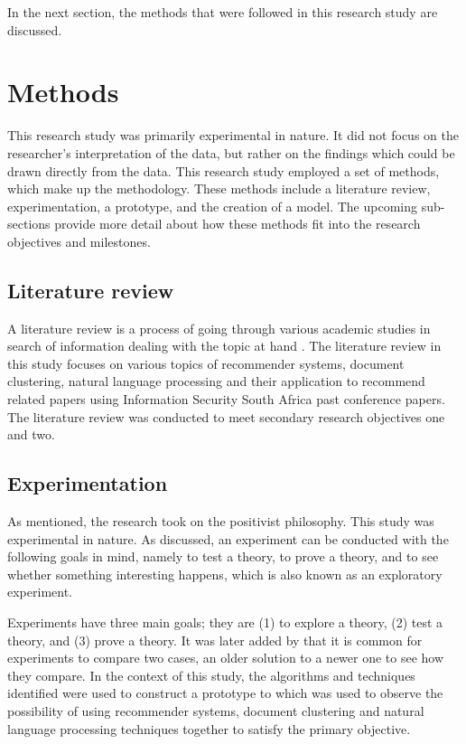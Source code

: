 In the next section, the methods that were followed in this research study are discussed.

\section{Methods} \label{ssec:meth}

This research study was primarily experimental in nature. It did not focus on the researcher’s interpretation of the data, but rather on the findings which could be drawn directly from the data. This research study employed a set of methods, which make up the methodology. These methods include a literature review, experimentation, a prototype, and the creation of a model. The upcoming sub-sections provide more detail about how these methods fit into the research objectives and milestones.

\subsection{Literature review} \label{ssec:prep}

A literature review is a process of going through various academic studies in search of information dealing with the topic at hand \cite{olivier2009information}. The literature review in this study focuses on various topics of recommender systems, document clustering, natural language processing and their application to recommend related papers using Information Security South Africa past conference papers. The literature review was conducted to meet secondary research objectives one and two.

\subsection{Experimentation} \label{ssec:exper}

As mentioned, the research took on the positivist philosophy. This study was experimental in nature. As  discussed, an experiment can be conducted with the following goals in mind, namely to test a theory, to prove a theory, and to see whether something interesting happens, which is also known as an exploratory experiment.

Experiments have three main goals; they are (1) to explore a theory, (2) test a theory, and (3) prove a theory. It was later added by  that it is common for experiments to compare two cases, an older solution to a newer one to see how they compare. In the context of this study, the algorithms and techniques identified were used to construct a prototype to which was used to observe the possibility of using recommender systems, document clustering and natural language processing techniques together to satisfy the primary objective.


